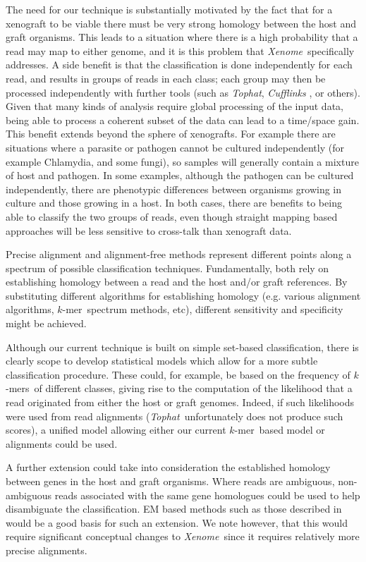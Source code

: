 \documentclass{bioinfo}
\newcommand{\Xenome}{\textit{Xenome}{}}
\newcommand{\Tophat}{\textit{Tophat}{}}
\newcommand{\kmer}{$k$-mer{}}
\newcommand{\kmers}{$k$-mers{}}
\begin{document}
The need for our technique is substantially motivated by the fact that
for a xenograft to be viable there must be very strong homology between
the host and graft organisms. This leads to a situation where there is a
high probability that a read may map to either genome, and it is this
problem that \Xenome\ specifically addresses. A side benefit is that the
classification is done independently for each read, and results in groups
of reads in each class; each group may then be processed independently
with further tools (such as \Tophat, \textit{Cufflinks} \citep{cufflinks},
or others). Given that many kinds of analysis require global processing of
the input data, being able to process a coherent subset of the data
can lead to a time/space gain. This benefit extends beyond the sphere
of xenografts. For example
there are situations where a parasite or pathogen cannot be cultured
independently (for example Chlamydia, and some fungi), so samples will
generally contain a mixture of host and pathogen. In some examples,
although the pathogen can be cultured independently, there are phenotypic
differences between organisms growing in culture and those growing in a
host. In both cases, there are benefits to being able to classify the
two groups of reads, even though straight mapping based approaches will
be less sensitive to cross-talk than xenograft data.

Precise alignment and alignment-free methods represent different points along
a spectrum of possible classification techniques.
Fundamentally, both rely on establishing homology between a
read and the host and/or graft references.
By substituting different algorithms for
establishing homology (e.g. various alignment algorithms, \kmer\ spectrum methods, etc),
different sensitivity and specificity might be achieved.

Although our current technique is built on simple set-based
classification, there is clearly scope to develop statistical models
which allow for a more subtle classification procedure.  These could,
for example, be based on the frequency of \kmers\ of different classes, giving
rise to the computation of the likelihood that a read
originated from either the host or graft genomes.  Indeed, if such
likelihoods were used from read alignments (\Tophat\ unfortunately
does not produce such scores), a unified model allowing either our
current \kmer\ based model or alignments could be used.

A further extension could take into consideration the established homology between genes in the
host and graft organisms. Where reads are ambiguous, non-ambiguous reads associated with the
same gene homologues could be used to help disambiguate the classification. EM based methods such as those described in \cite{Newkirk:2011cb, Chung:2011fv, Hormozdiari:2010jr}
would be a good basis for such an extension. We note however, that this would require significant
conceptual changes to \Xenome\ since it requires relatively more precise alignments.
\end{document}
